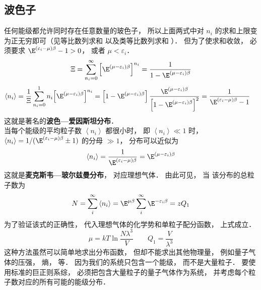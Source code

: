\subsection{波色子} 
任何能级都允许同时存在任意数量的玻色子， 所以上面两式中对 ${n_i}$ 的求和上限变为正无穷即可（见等比数列求和%
以及类等比数列求和%
）． 但为了使求和收敛， 必须要求 ${\E^{\left( {{\varepsilon _i} - \mu } \right)\beta }} - 1 > 0$，  或者 $\mu  < {\varepsilon _i}$． 
\begin{equation}
  \Xi  = \sum\limits_{{n_i} = 0}^\infty  {{{\left[ {{\E^{\left( {\mu  - {\varepsilon _i}} \right)\beta }}} \right]}^{{n_i}}}}  = \frac{1}{{1 - {\E^{\left( {\mu  - {\varepsilon _i}} \right)\beta }}}}
\end{equation}
\begin{equation}
\begin{aligned}
  \left\langle {{n_i}} \right\rangle & = \frac{1}{\Xi }\sum\limits_{{n_i} = 0}^1 {{n_i}{{\left[ {{\E^{\left( {\mu  - {\varepsilon _i}} \right)\beta }}} \right]}^{{n_i}}}} = \left[ {1 - {\E^{\left( {\mu  - {\varepsilon _i}} \right)\beta }}} \right]\frac{{{\E^{\left( {\mu  - {\varepsilon _i}} \right)\beta }}}}{{{{\left[ {1 - {\E^{\left( {\mu  - {\varepsilon _i}} \right)\beta }}} \right]}^2}}}  = \frac{1}{{{\E^{\left( {{\varepsilon _i} - \mu } \right)\beta }} - 1}}
  \end{aligned}
\end{equation}
这就是著名的\textbf{波色—爱因斯坦分布}．\\
当每个能级的平均粒子数 $\left\langle {{n_i}} \right\rangle $ 都很小时， 即 $\left\langle {{n_i}} \right\rangle \ll 1$ 时， $\left\langle {{n_i}} \right\rangle  = {1}/({{{\E^{\left( {{\varepsilon _i} - \mu } \right)\beta }} \pm 1}})$ 的分母 $ \gg 1$，  分布可以近似为
\begin{equation}
  \left\langle {{n_i}} \right\rangle  = \frac{1}{{{\E^{\left( {{\varepsilon _i} - \mu } \right)\beta }}}} = {\E^{\left( {\mu  - {\varepsilon _i}} \right)\beta }}
\end{equation}
这就是\textbf{麦克斯韦—玻尔兹曼分布}， 对应理想气体． 由此可见， 当 %
该分布的总粒子数为
\begin{equation}
  N = \sum\limits_i^\infty  {\left\langle {{n_i}} \right\rangle }  = {\E^{\mu \beta }}\sum\limits_i^\infty  {{\E^{ - {\varepsilon _i}\beta }}}  = z{Q_1}
\end{equation}
为了验证该式的正确性， 代入理想气体的化学势和单粒子配分函数， 上式成立．
\begin{equation}
  \mu  = kT\ln \frac{{N{\lambda ^3}}}{V} 
  \qquad
  {Q_1} = \frac{V}{{{\lambda ^3}}}
\end{equation}
这种方法虽然可以简单地求出分布函数， 但却不能求出其他物理量， 例如量子气体的压强， 熵， 等． 因为我们的系统只包含一个能级， 而不是大量粒子． 要使用标准的巨正则系综， 必须把包含大量粒子的量子气体作为系统， 并考虑每个粒子数对应的所有可能的能级分布．\\